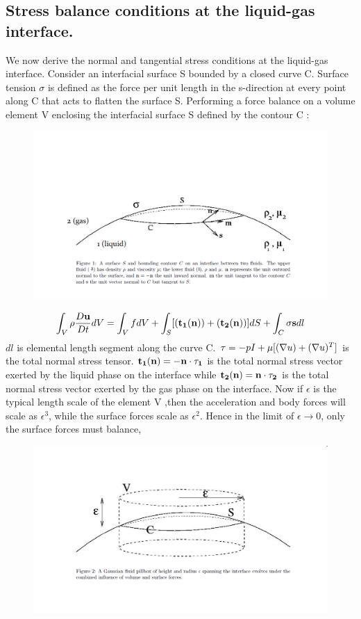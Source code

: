 \documentclass{article}
\begin{document}
\subsection{Stress balance conditions at the liquid-gas interface.}
We now derive the normal and tangential stress conditions at the liquid-gas interface.
Consider an interfacial surface S bounded by a closed curve C.  Surface tension $\sigma$ is defined as the force per unit length in the s-direction at every point along C that acts to flatten the surface S.  Performing a force balance on a volume element V enclosing the interfacial surface S  defined by the contour C : \newline
\begin{figure}[b] 
  \includegraphics[scale=0.5]{interface1.png}
\end{figure}
\newline
\begin{equation}
\int_V \rho\frac{D{\bf u}}{Dt} dV = \int_V f dV + \int_S [{\bf(t_{1}(n))} + {\bf(t_{2}(n))}] dS + \int_C \sigma {\bf s} dl
\end{equation}
$dl$ is elemental length segment along the curve C. 
${\bf \tau} = -pI + \mu[(\nabla u)+ (\nabla u)^T]$ is the total normal stress tensor.
${\bf t_{1}(n)} ={\bf -n\cdot\tau_{1}}$ is the total normal stress vector exerted by the liquid phase on the interface  while ${\bf t_{2}(n)} ={\bf n\cdot\tau_{2}}$ is the total normal stress vector exerted by the gas phase on the interface.
Now if $\epsilon $ is the typical length scale of the element V ,then the acceleration and body forces will scale as $\epsilon^3$, while the surface forces scale as $\epsilon^2$. Hence in the limit of $\epsilon \rightarrow 0$, only the surface forces must balance,
\begin{figure}[H]
  \includegraphics[width=6.5in]{pillbox.png}
\end{figure}
\end{document}
